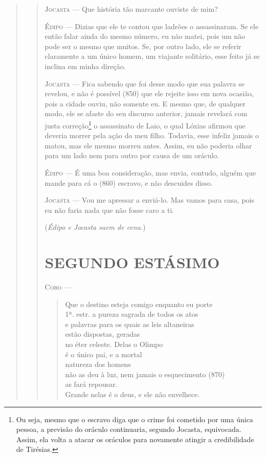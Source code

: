 \begin{verse}
\begin{verse}
\textsc{Jocasta} --- Que história tão marcante ouviste de mim?

\textsc{Édipo} --- Dizias que ele te contou que ladrões o assassinaram. Se ele então falar
ainda do mesmo número, eu não matei, pois um não pode ser o mesmo que
muitos. Se, por outro lado, ele se referir claramente a um único homem,
um viajante solitário, esse feito já se inclina em minha direção.

\textsc{Jocasta} --- Fica sabendo que foi desse modo que sua palavra se revelou, e não é
possível (850) que ele rejeite isso em nova ocasião, pois a cidade
ouviu, não somente eu. E mesmo que, de qualquer modo, ele se afaste do
seu discurso anterior, jamais revelará com justa correção\footnote{Ou
  seja, mesmo que o escravo diga que o crime foi cometido por uma única
  pessoa, a previsão do oráculo continuaria, segundo Jocasta,
  equivocada. Assim, ela volta a atacar os oráculos para novamente
  atingir a credibilidade de Tirésias.} o assassinato de Laio, o qual
Lóxias afirmou que deveria morrer pela ação do meu filho. Todavia, esse
infeliz jamais o matou, mas ele mesmo morreu antes. Assim, eu não
poderia olhar para um lado nem para outro por causa de um oráculo.

\textsc{Édipo} --- É uma boa consideração, mas envia, contudo, alguém que mande para cá o
(860) escravo, e não descuides disso.

\textsc{Jocasta} --- Vou me apressar a enviá-lo. Mas vamos para casa, pois eu não faria nada
que não fosse caro a ti.

(\emph{Édipo e Jocasta saem de cena.})

\section{SEGUNDO ESTÁSIMO}

\textsc{Coro} --- \begin{verse}Que o destino esteja comigo enquanto eu porte\\ 1ª. estr.
a pureza sagrada de todos os atos\\
e palavras para os quais as leis altaneiras\\
estão dispostas, geradas\\
no éter celeste. Delas o Olimpo\\
é o único pai, e a mortal\\
natureza dos homens\\
não as deu à luz, nem jamais o esquecimento (870)\\
as fará repousar.\\
Grande nelas é o deus, e ele não envelhece.


\end{verse}
\end{verse}
\end{verse}
